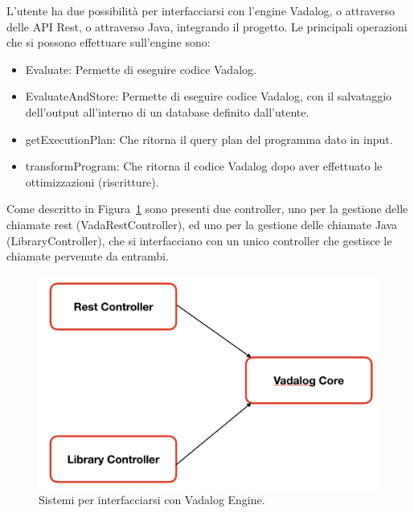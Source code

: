 L'utente ha due possibilità per interfacciarsi con l'engine Vadalog, o attraverso delle API Rest, o attraverso Java, integrando il progetto. \newline
Le principali operazioni che si possono effettuare sull'engine sono: 
\begin{itemize}
	\item Evaluate: Permette di eseguire codice Vadalog.
	\item EvaluateAndStore: Permette di eseguire codice Vadalog, con il salvataggio dell'output all'interno di un database definito dall'utente.
	\item getExecutionPlan: Che ritorna il query plan del programma dato in input.
	\item transformProgram: Che ritorna il codice Vadalog dopo aver effettuato le ottimizzazioni (riscritture).
\end{itemize}
Come descritto in Figura~\ref{fig:architettura_2} sono presenti due controller, uno per la gestione delle chiamate rest (VadaRestController), ed uno per la gestione delle chiamate Java (LibraryController), che si interfacciano con un unico controller che gestisce le chiamate pervenute da entrambi. \newline

\begin{figure}[h!]
	\centering
	\includegraphics[width=0.8\linewidth]{figure/architettura-2}
	\caption{Sistemi per interfacciarsi con Vadalog Engine.}
	\label{fig:architettura_2}
\end{figure}

